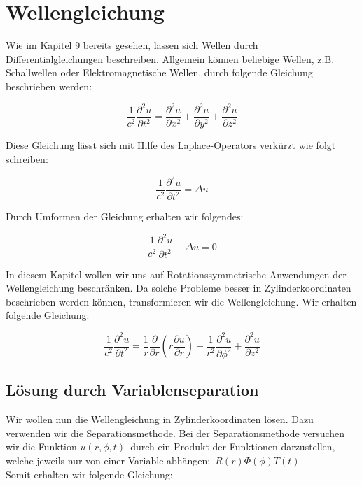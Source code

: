 \section{Wellengleichung}

Wie im Kapitel 9 bereits gesehen, lassen sich Wellen durch Differentialgleichungen beschreiben. Allgemein können beliebige Wellen, z.B. Schallwellen oder Elektromagnetische Wellen, durch folgende Gleichung beschrieben werden:

\begin{equation}
\frac{1}{c^2} \frac{\partial^2 u}{\partial t^2} = \frac{\partial^2 u}{\partial x^2} + \frac{\partial^2 u}{\partial y^2} + \frac{\partial^2 u}{\partial z^2}
\end{equation}

Diese Gleichung lässt sich mit Hilfe des Laplace-Operators verkürzt wie folgt schreiben:

\begin{equation}
\frac{1}{c^2} \frac{\partial^2 u}{\partial t^2} = \Delta u
\end{equation}

Durch Umformen der Gleichung erhalten wir folgendes:

\begin{equation}
\frac{1}{c^2} \frac{\partial^2 u}{\partial t^2} - \Delta u = 0
\end{equation}

In diesem Kapitel wollen wir uns auf Rotationssymmetrische Anwendungen der Wellengleichung beschränken. Da solche Probleme besser in Zylinderkoordinaten beschrieben werden können, transformieren wir die Wellengleichung. Wir erhalten folgende Gleichung:

\begin{equation}
\frac{1}{c^2} \frac{\partial^2 u}{\partial t^2} = \frac{1}{r} \frac{\partial}{\partial r}(r \frac{\partial u}{\partial r}) + \frac{1}{r^2} \frac{\partial^2 u}{\partial \phi^2} + \frac{\partial^2 u}{\partial z^2} 
\end{equation}

\subsection[Variablenseparation]{Lösung durch Variablenseparation}

Wir wollen nun die Wellengleichung in Zylinderkoordinaten lösen. Dazu verwenden wir die Separationsmethode.
Bei der Separationsmethode versuchen wir die Funktion $u(r, \phi, t)$ durch ein Produkt der Funktionen darzustellen, welche jeweils nur von einer Variable abhängen: $R(r)\Phi(\phi)T(t)$
\\Somit erhalten wir folgende Gleichung:

